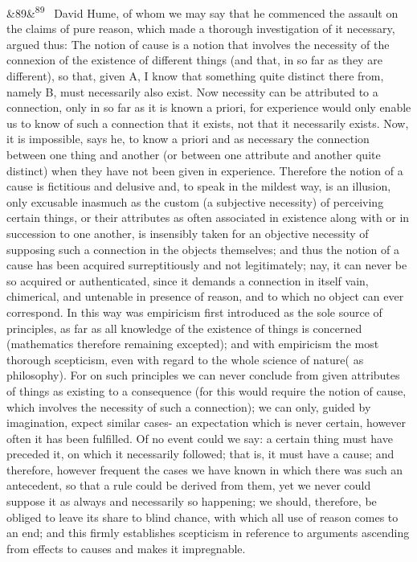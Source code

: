 \documentclass[12pt]{article}
\newcommand{\para}[1][]{\par\noindent\ifx&#1&\else\textsuperscript{\footnotesize #1}~\fi}
\begin{document}
\para[89] David Hume, of whom we may say that he commenced the assault on the claims of pure reason, which made a thorough investigation of it necessary, argued thus: The notion of cause is a notion that involves the necessity of the connexion of the existence of different things (and that, in so far as they are different), so that, given A, I know that something quite distinct there from, namely B, must necessarily also exist. Now necessity can be attributed to a connection, only in so far as it is known a priori, for experience would only enable us to know of such a connection that it exists, not that it necessarily exists. Now, it is impossible, says he, to know a priori and as necessary the connection between one thing and another (or between one attribute and another quite distinct) when they have not been given in experience. Therefore the notion of a cause is fictitious and delusive and, to speak in the mildest way, is an illusion, only excusable inasmuch as the custom (a subjective necessity) of perceiving certain things, or their attributes as often associated in existence along with or in succession to one another, is insensibly taken for an objective necessity of supposing such a connection in the objects themselves; and thus the notion of a cause has been acquired surreptitiously and not legitimately; nay, it can never be so acquired or authenticated, since it demands a connection in itself vain, chimerical, and untenable in presence of reason, and to which no object can ever correspond. In this way was empiricism first introduced as the sole source of principles, as far as all knowledge of the existence of things is concerned (mathematics therefore remaining excepted); and with empiricism the most thorough scepticism, even with regard to the whole science of nature( as philosophy). For on such principles we can never conclude from given attributes of things as existing to a consequence (for this would require the notion of cause, which involves the necessity of such a connection); we can only, guided by imagination, expect similar cases- an expectation which is never certain, however often it has been fulfilled. Of no event could we say: a certain thing must have preceded it, on which it necessarily followed; that is, it must have a cause; and therefore, however frequent the cases we have known in which there was such an antecedent, so that a rule could be derived from them, yet we never could suppose it as always and necessarily so happening; we should, therefore, be obliged to leave its share to blind chance, with which all use of reason comes to an end; and this firmly establishes scepticism in reference to arguments ascending from effects to causes and makes it impregnable.
\end{document}
